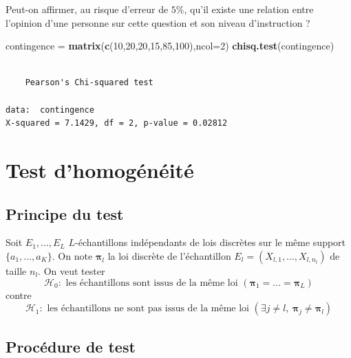 \documentclass[
]{book}
\newenvironment{Shaded}{\begin{snugshade}}{\end{snugshade}}
\newcommand{\DataTypeTok}[1]{\textcolor[rgb]{0.13,0.29,0.53}{#1}}
\newcommand{\DecValTok}[1]{\textcolor[rgb]{0.00,0.00,0.81}{#1}}
\newcommand{\KeywordTok}[1]{\textcolor[rgb]{0.13,0.29,0.53}{\textbf{#1}}}
\newcommand{\NormalTok}[1]{#1}
\newcommand{\StringTok}[1]{\textcolor[rgb]{0.31,0.60,0.02}{#1}}
\theoremstyle{definition}
\theoremstyle{definition}
\theoremstyle{definition}
\theoremstyle{definition}
\theoremstyle{remark}
\begin{document}
Peut-on affirmer, au risque d'erreur de \(5\%\), qu'il existe une relation entre l'opinion d'une personne sur cette question et son niveau d'instruction ?

\begin{Shaded}
\begin{Highlighting}[]
\NormalTok{contingence =}\StringTok{ }\KeywordTok{matrix}\NormalTok{(}\KeywordTok{c}\NormalTok{(}\DecValTok{10}\NormalTok{,}\DecValTok{20}\NormalTok{,}\DecValTok{20}\NormalTok{,}\DecValTok{15}\NormalTok{,}\DecValTok{85}\NormalTok{,}\DecValTok{100}\NormalTok{),}\DataTypeTok{ncol=}\DecValTok{2}\NormalTok{)}
\KeywordTok{chisq.test}\NormalTok{(contingence)}
\end{Highlighting}
\end{Shaded}

\begin{verbatim}

    Pearson's Chi-squared test

data:  contingence
X-squared = 7.1429, df = 2, p-value = 0.02812
\end{verbatim}

\hypertarget{test-dhomoguxe9nuxe9ituxe9}{%
\section{Test d'homogénéité}\label{test-dhomoguxe9nuxe9ituxe9}}

\hypertarget{principe-du-test-2}{%
\subsection{Principe du test}\label{principe-du-test-2}}

Soit \(E_1, \ldots, E_L\) \(L\)-échantillons indépendants de lois discrètes sur le même support \(\{a_1,\ldots,a_K\}\). On note \(\boldsymbol{\pi}_l\) la loi discrète de l'échantillon \(E_l=(X_{l,1},\ldots,X_{l,n_l})\) de taille \(n_l\).
On veut tester
\[
\mathcal{H}_0: \textrm{ les échantillons sont issus de la même loi } (\boldsymbol{\pi}_1=\ldots=\boldsymbol{\pi}_L)
\]
contre
\[
\mathcal{H}_1: \textrm{ les échantillons ne sont pas issus de la même loi } (\exists j\neq l,\ \boldsymbol{\pi}_j \neq \boldsymbol{\pi}_l)
\]

\hypertarget{procuxe9dure-de-test-3}{%
\subsection{Procédure de test}\label{procuxe9dure-de-test-3}}
\end{document}
